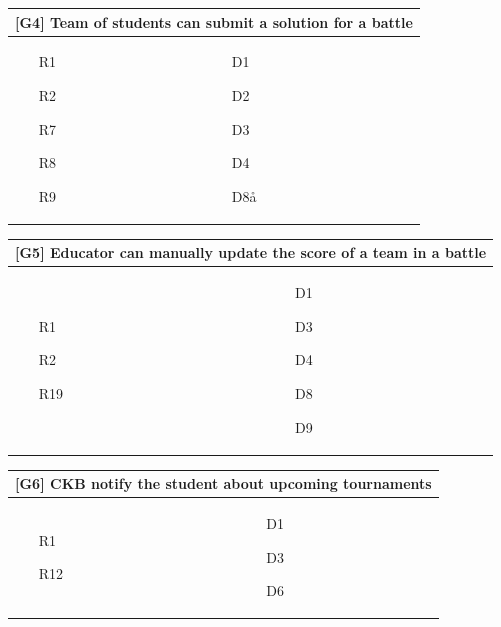 \begin{tabular}{|p{6cm}|p{6cm}|}
    \hline
    \multicolumn{2}{|c|}{[G4] Team of students can submit a solution for a battle} \\
    \hline
    \begin{itemize}
        \item [R1]
        \item [R2]
        \item [R7]
        \item [R8]
        \item [R9]
    \end{itemize}
    &
    \begin{itemize}
        \item [D1]
        \item [D2]
        \item [D3]
        \item [D4]
        \item [D8å]
    \end{itemize}
    \\
    \hline
\end{tabular}

\begin{tabular}{|p{6cm}|p{6cm}|}
    \hline
    \multicolumn{2}{|c|}{[G5] Educator can manually update the score of a team in a battle} \\
    \hline
    \begin{itemize}
        \item [R1]
        \item [R2]
        \item [R19]
    \end{itemize}
    &
    \begin{itemize}
        \item [D1]
        \item [D3]
        \item [D4]
        \item [D8]
        \item [D9]
    \end{itemize}
    \\
    \hline
\end{tabular}

\begin{tabular}{|p{6cm}|p{6cm}|}
    \hline
    \multicolumn{2}{|c|}{[G6] CKB notify the student about upcoming tournaments} \\
    \hline
    \begin{itemize}
        \item [R1]
        \item [R12]
    \end{itemize}
    &
    \begin{itemize}
        \item [D1]
        \item [D3]
        \item [D6]
    \end{itemize}
    \\
    \hline
\end{tabular}

